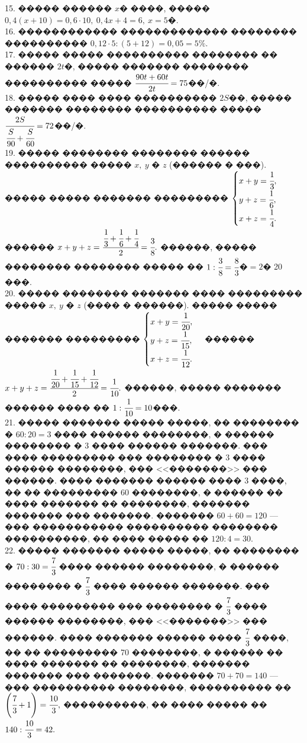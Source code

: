 \documentclass[12pt]{article}
\begin{document}
15. ����� ������ $x$� ����, ����� $0,4(x+10)=0,6\cdot10,\ 0,4x+4=6,\ x=5$�.\\
16. ������������ ������������� �������� ���������� $0,12\cdot5:(5+12)=0,05=5\%.$\\
17. ����� ����� ���������� �������� �� ������ $2t$�, ����� ������� �������� ���������� ����� $\cfrac{90t+60t}{2t}=75$��/�.\\
18. ����� ���� ���� ���������� $2S$��, ����� ������� �������� ���������� ����� $\cfrac{2S}{\cfrac{S}{90}+\cfrac{S}{60}}=72$��/�.\\
19. ����� �������� �������� ������ ���������� ����� $x,\ y$ � $z$ (������ � ���). ����� ����� ������� ��������� $\begin{cases} x+y=\cfrac{1}{3},\\ y+z=\cfrac{1}{6},\\ x+z=\cfrac{1}{4}.\end{cases}$ ������ $x+y+z=\cfrac{\cfrac{1}{3}+\cfrac{1}{6}+\cfrac{1}{4}}{2}=\cfrac{3}{8}.$ ������, ����� �������� �������� ����� �� $1:\cfrac{3}{8}=\cfrac{8}{3}$�$=2$� 20 ���.\\
20. ����� �������� ������� ���� ��������� ����� $x,\ y$ � $z$ (���� � ������). ����� ����� ������� ��������� $\begin{cases} x+y=\cfrac{1}{20},\\ y+z=\cfrac{1}{15},\\ x+z=\cfrac{1}{12}.\end{cases}$ ������ $x+y+z=\cfrac{\cfrac{1}{20}+\cfrac{1}{15}+\cfrac{1}{12}}{2}=\cfrac{1}{10}.$ ������, ����� ������� ������ ���� �� $1:\cfrac{1}{10}=10$���.\\
21. ����� ������� ����� �����, �� �������� � $60:20=3$ ���� ������ ��������, � ������ �������� � 3 ���� ������ �������. ��� ���� ��������� ��� �������� � 3 ���� ������ ��������, ��� <<�������>> ��� ������. ���� ������� ������ ���� 3 ����, �� �� ��������� 60 ��������, � ������ �� ���� ������� �� ��������, ������� ������� ��� �������. ������� $60+60=120$ --- ��� ����������� ���������� �������� ����������, �� ���� ����� �� $120:4=30.$\\
22. ����� ������� ����� �����, �� �������� � $70:30=\cfrac{7}{3}$ ���� ������ ��������, � ������ �������� � $\cfrac{7}{3}$ ���� ������ �������. ��� ���� ��������� ��� �������� � $\cfrac{7}{3}$ ���� ������ ��������, ��� <<�������>> ��� ������. ���� ������� ������ ���� $\cfrac{7}{3}$ ����, �� �� ��������� 70 ��������, � ������ �� ���� ������� �� ��������, ������� ������� ��� �������. ������� $70+70=140$ --- ��� ���������� ��������, ���������� �� $\left(\cfrac{7}{3}+1\right)=\cfrac{10}{3},$ ����������, �� ���� ����� �� $140:\cfrac{10}{3}=42.$\\
\end{document}
